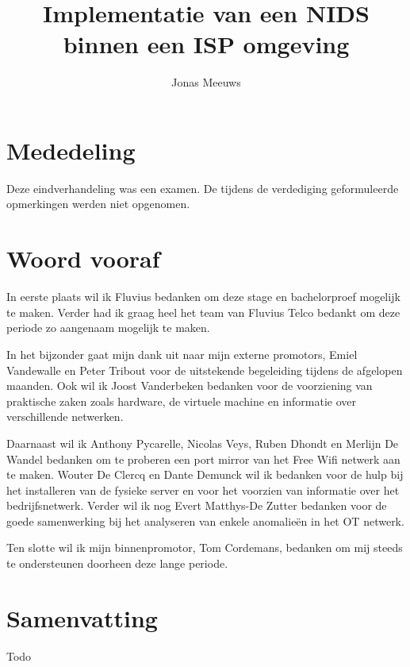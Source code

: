 \documentclass[a4paper,12pt]{report}
\title{Implementatie van een NIDS binnen een ISP omgeving}
\author{Jonas Meeuws}
\begin{document}


\newpage
\thispagestyle{empty}
\mbox{}



\chapter*{Mededeling}
Deze eindverhandeling was een examen.
De tijdens de verdediging geformuleerde opmerkingen werden niet opgenomen.

\chapter*{Woord vooraf}
In eerste plaats wil ik Fluvius bedanken om deze stage en bachelorproef mogelijk te maken.
Verder had ik graag heel het team van Fluvius Telco bedankt om deze periode zo aangenaam mogelijk te maken.

In het bijzonder gaat mijn dank uit naar mijn externe promotors, Emiel Vandewalle en Peter Tribout voor de uitstekende begeleiding tijdens de afgelopen maanden.
Ook wil ik Joost Vanderbeken bedanken voor de voorziening van praktische zaken zoals hardware, de virtuele machine en informatie over verschillende netwerken.

Daarnaast wil ik Anthony Pycarelle, Nicolas Veys, Ruben Dhondt en Merlijn De Wandel bedanken om te proberen een port mirror van het Free Wifi netwerk aan te maken.
Wouter De Clercq en Dante Demunck wil ik bedanken voor de hulp bij het installeren van de fysieke server en voor het voorzien van informatie over het bedrijfsnetwerk.
Verder wil ik nog Evert Matthys-De Zutter bedanken voor de goede samenwerking bij het analyseren van enkele anomalieën in het OT netwerk.

Ten slotte wil ik mijn binnenpromotor, Tom Cordemans, bedanken om mij steeds te ondersteunen doorheen deze lange periode.

\chapter*{Samenvatting}
Todo

\tableofcontents
\newpage
\end{document}
